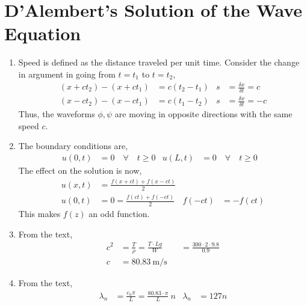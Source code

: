 \section{D'Alembert's Solution of the Wave Equation}

\begin{enumerate}
    \item Speed is defined as the distance traveled per unit time.
          Consider the change in argument in going from $ t = t_1 $ to $ t = t_2 $,
          \begin{align}
              (x + ct_2) - (x + ct_1) & = c(t_2 - t_1)                   &
              s                       & = \frac{\delta x}{\delta t} = c    \\
              (x - ct_2) - (x - ct_1) & = c(t_1 - t_2)                   &
              s                       & = \frac{\delta x}{\delta t} = -c
          \end{align}
          Thus, the waveforms $ \phi, \psi $ are moving in opposite directions with the
          same speed $ c $.

    \item The boundary conditions are,
          \begin{align}
              u(0, t) & = 0 \quad \forall \quad t\geq 0 &
              u(L, t) & = 0 \quad \forall \quad t\geq 0 &
          \end{align}
          The effect on the solution is now,
          \begin{align}
              u(x, t) & = \frac{f(x + ct) + f(x - ct)}{2}   \\
              u(0, t) & = 0 = \frac{f(ct) + f(-ct)}{2}    &
              f(-ct)  & = -f(ct)
          \end{align}
          This makes $ f(z) $ an odd function.

    \item From the text,
          \begin{align}
              c^2 & = \frac{T}{\rho} = \frac{T \cdot Lg}{W} &
                  & = \frac{300 \cdot 2 \cdot 9.8}{0.9}       \\
              c   & = \SI{80.83}{\m\per\s}
          \end{align}

    \item From the text,
          \begin{align}
              \lambda_n & = \frac{c_n\pi}{L} = \frac{80.83 \cdot \pi}{L}\ n &
              \lambda_n & = 127n
          \end{align}


\end{enumerate}
